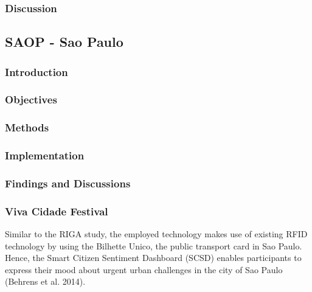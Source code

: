 \subsubsection{Discussion}



\subsection{SAOP - Sao Paulo}

\subsubsection {Introduction} 
\subsubsection {Objectives} 
\subsubsection {Methods}
\subsubsection {Implementation}
\subsubsection {Findings and Discussions}

\subsubsection{Viva Cidade Festival}

Similar to the RIGA study, the employed technology makes use of existing RFID technology by using the Bilhette Unico, the public transport card in Sao Paulo. 
Hence, the Smart Citizen Sentiment Dashboard (SCSD) enables participants to express their mood about urgent urban challenges in the city of Sao Paulo (Behrens et al. 2014).

